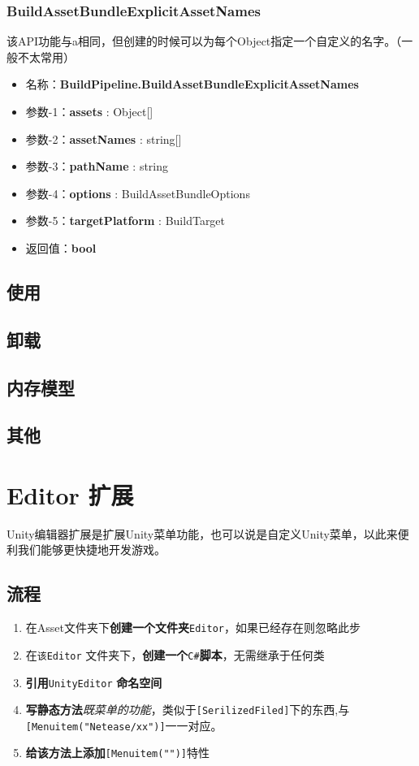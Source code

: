 \documentclass[UTF8,a4paper,12pt]{ctexbook}
\begin{document}
			
			
		\subsection{BuildAssetBundleExplicitAssetNames}
			该API功能与a相同，但创建的时候可以为每个Object指定一个自定义的名字。（一般不太常用）
			
			\begin{itemize}
				\item 名称：\textbf{BuildPipeline.BuildAssetBundleExplicitAssetNames}
				\item 参数-1：\textbf{assets} : Object[]
				\item 参数-2：\textbf{assetNames} : string[]
				\item 参数-3：\textbf{pathName} : string
				\item 参数-4：\textbf{options} : BuildAssetBundleOptions
				\item 参数-5：\textbf{targetPlatform} : BuildTarget
				\item 返回值：\textbf{bool}
			\end{itemize}			
		    
	\section{使用}
	
	\section{卸载}
	
	\section{内存模型}
	
	\section{其他}

\chapter{Editor 扩展}
	Unity编辑器扩展是扩展Unity菜单功能，也可以说是自定义Unity菜单，以此来便利我们能够更快捷地开发游戏。
	\section{流程}
		\begin{enumerate}
			\item 在Asset文件夹下\textbf{创建一个文件夹}\verb|Editor|，如果已经存在则忽略此步
			\item 在\verb|该Editor| 文件夹下，\textbf{创建一个}\verb|C#|\textbf{脚本}，无需继承于任何类
			\item \textbf{引用}\verb|UnityEditor| \textbf{命名空间}
			\item \textbf{写静态方法}\textit{既菜单的功能}，类似于\verb|[SerilizedFiled]|下的东西,与\verb|[Menuitem("Netease/xx")]|一一对应。
			\item \textbf{给该方法上添加}\verb|[Menuitem("")]|特性
		\end{enumerate}	
	
\end{document}
